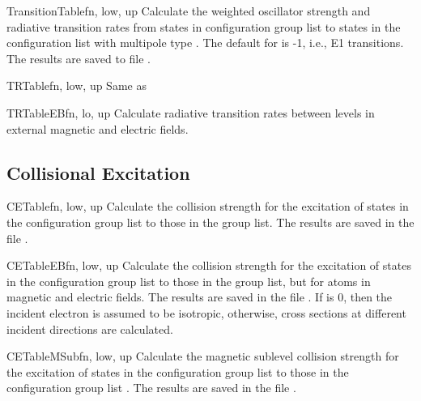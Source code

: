 \begin{fundesc}{TransitionTable}{fn, low, up}
Calculate the weighted oscillator strength and radiative transition rates from
states in configuration group list  to states in the configuration list
 with multipole type . The default for  is -1, i.e., E1
transitions. The results are saved to file .
\end{fundesc}

\begin{fundesc}{TRTable}{fn, low, up}
Same as 
\end{fundesc}

\begin{fundesc}{TRTableEB}{fn, lo, up}
Calculate radiative transition rates between levels in external magnetic and
electric fields.
\end{fundesc}


\subsection{Collisional Excitation}

\begin{fundesc}{CETable}{fn, low, up}
Calculate the collision strength for the excitation of states in the
configuration group list  to those in the group list. The
results are saved in the file .
\end{fundesc}

\begin{fundesc}{CETableEB}{fn, low, up}
Calculate the collision strength for the excitation of states in the
configuration group list  to those in the group list, but for
atoms in magnetic and electric fields. The
results are saved in the file . If  is 0, then the incident
electron is assumed to be isotropic, otherwise, cross sections at different
incident directions are calculated.
\end{fundesc}

\begin{fundesc}{CETableMSub}{fn, low, up}
Calculate the magnetic sublevel collision strength for the excitation of states
in the configuration group list  to those in the configuration group
list . The results are saved in the file .
\end{fundesc}

